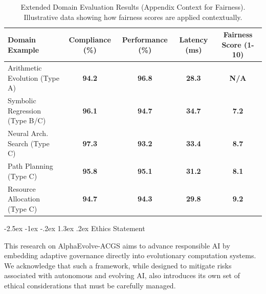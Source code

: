 \documentclass[manuscript,screen,review,anonymous,9pt]{acmart}
\makeatletter
\renewcommand\section{\@startsection{section}{1}{\z@}%
  {-2.5ex \@plus -1ex \@minus -.2ex}%
  {1.3ex \@plus.2ex}%
  {\normalfont\Large\bfseries}}
\newcommand{\tablesize}{\footnotesize} %
\newcommand{\tablenumfmt}[1]{\textbf{#1}}
\newcommand{\tableheader}[1]{\textbf{#1}}
\makeatother
\begin{document}
\begin{table}[htbp]
\centering
\caption{Extended Domain Evaluation Results (Appendix Context for Fairness). Illustrative data showing how fairness scores are applied contextually.}
\label{tab:appendix_extended_domain_results_fairness}
\tablesize
\begin{tabular}{@{}lcccc@{}}
\toprule
\tableheader{Domain Example} & \tableheader{Compliance (\%)} & \tableheader{Performance (\%)} & \tableheader{Latency (ms)} & \tableheader{Fairness Score (1-10)} \\
\midrule
Arithmetic Evolution (Type A) & \tablenumfmt{94.2} & \tablenumfmt{96.8} & \tablenumfmt{28.3} & \tablenumfmt{N/A} \\
Symbolic Regression (Type B/C) & \tablenumfmt{96.1} & \tablenumfmt{94.7} & \tablenumfmt{34.7} & \tablenumfmt{7.2} \\
Neural Arch. Search (Type C) & \tablenumfmt{97.3} & \tablenumfmt{93.2} & \tablenumfmt{33.4} & \tablenumfmt{8.7} \\
Path Planning (Type C) & \tablenumfmt{95.8} & \tablenumfmt{95.1} & \tablenumfmt{31.2} & \tablenumfmt{8.1} \\
Resource Allocation (Type C) & \tablenumfmt{94.7} & \tablenumfmt{94.3} & \tablenumfmt{29.8} & \tablenumfmt{9.2} \\
\bottomrule
\end{tabular}
\end{table}

\section{Ethics Statement}
\label{sec:ethics}

This research on AlphaEvolve-ACGS aims to advance responsible AI by embedding adaptive governance directly into evolutionary computation systems. We acknowledge that such a framework, while designed to mitigate risks associated with autonomous and evolving AI, also introduces its own set of ethical considerations that must be carefully managed.
\end{document}
